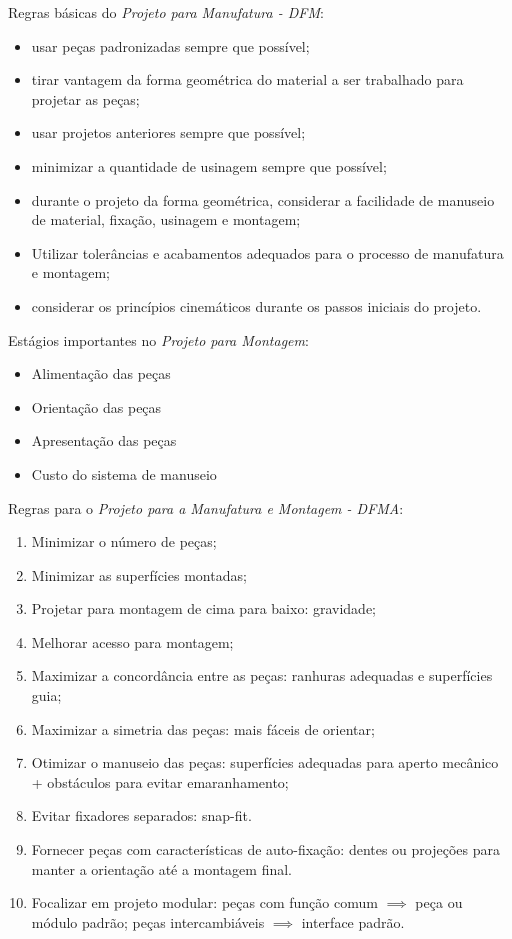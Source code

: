 \documentclass[a4paper]{report}
\begin{document}
Regras básicas do \emph{Projeto para Manufatura - DFM}:
\begin{itemize}
\item usar peças padronizadas sempre que possível;
\item tirar vantagem da forma geométrica do material a ser trabalhado para projetar as peças;
\item usar projetos anteriores sempre que possível;
\item minimizar a quantidade de usinagem sempre que possível;
\item durante o projeto da forma geométrica, considerar a facilidade de manuseio de material, fixação, usinagem e montagem;
\item Utilizar tolerâncias e acabamentos adequados para o processo de manufatura e montagem;
\item considerar os princípios cinemáticos durante os passos iniciais do projeto.
\end{itemize}

Estágios importantes no \emph{Projeto para Montagem}:
\begin{itemize}
    \item Alimentação das peças
	\item Orientação das peças
	    \item Apresentação das peças
		\item Custo do sistema de manuseio
\end{itemize}

Regras para o \emph{Projeto para a Manufatura e Montagem - DFMA}:
\begin{enumerate}
    \item Minimizar o número de peças;
    \item Minimizar as superfícies montadas;
    \item Projetar para montagem de cima para baixo: gravidade;
    \item Melhorar acesso para montagem;
    \item Maximizar a concordância entre as peças: ranhuras adequadas e superfícies guia;
    \item Maximizar a simetria das peças: mais fáceis de orientar;
    \item Otimizar o manuseio das peças: superfícies adequadas para aperto mecânico + obstáculos para evitar emaranhamento;
    \item Evitar fixadores separados: snap-fit.
    \item Fornecer peças com características de auto-fixação: dentes ou projeções para manter a orientação até a montagem final.
    \item Focalizar em projeto modular: peças com função comum $\implies$ peça ou módulo padrão; peças intercambiáveis $\implies$ interface padrão.
\end{enumerate}
\end{document}
